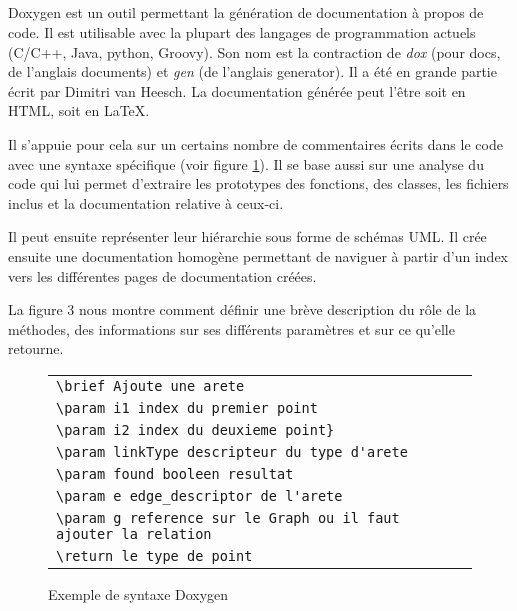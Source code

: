 \subparagraph{}
Doxygen est un outil permettant la génération de documentation à propos de code. Il est utilisable avec la plupart des langages de programmation actuels (C/C++, Java, python, Groovy). Son nom est la contraction de \textit{dox} (pour docs, de l'anglais documents) et \textit{gen} (de l'anglais generator). Il a été en grande partie \'ecrit par Dimitri van Heesch. La documentation g\'en\'er\'ee peut l'\^etre soit en HTML, soit en \LaTeX.

\par Il s'appuie pour cela sur un certains nombre de commentaires \'ecrits dans le code avec une syntaxe sp\'ecifique (voir figure \ref{exemple_doxygen}). Il se base aussi sur une analyse du code qui lui permet d'extraire les prototypes des fonctions, des classes, les fichiers inclus et la documentation relative à ceux-ci.

\par Il peut ensuite repr\'esenter leur hi\'erarchie sous forme de sch\'emas UML. Il crée ensuite une documentation homogène permettant de naviguer à partir d'un index vers les différentes pages de documentation créées.

	La figure 3 nous montre comment définir une br\`eve description du r\^ole de la méthodes, des informations sur ses diff\'erents param\`etres et sur ce qu'elle retourne.

\begin{figure}[H]
        \begin{center}
                \begin{tabular}{l}
                        \hline
                        \verb|\brief Ajoute une arete|\\
                        \verb|\param i1 index du premier point|\\
                        \verb|\param i2 index du deuxieme point} |\\
                        \verb|\param linkType descripteur du type d'arete|\\
			\verb|\param found booleen resultat |\\
			\verb|\param e edge_descriptor de l'arete|\\
			\verb|\param g reference sur le Graph ou il faut ajouter la relation|\\
			\verb|\return le type de point|\\
                        \hline
                \end{tabular}
        \end{center}
\caption{\label{exemple_doxygen} Exemple de syntaxe Doxygen}
\end{figure}
